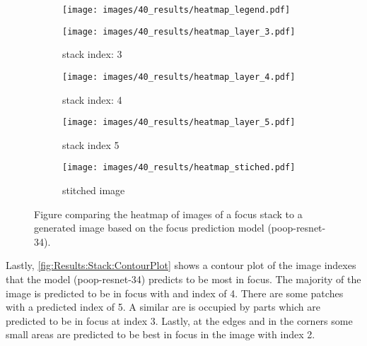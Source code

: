 \begin{figure}
    \centering
    \begin{subfigure}[b]{0.75\textwidth}
        \centering
        \texttt{[image: images/40\_results/heatmap\_legend.pdf]}
    \end{subfigure}
    \begin{subfigure}[b]{0.45\textwidth}
        \centering
        \texttt{[image: images/40\_results/heatmap\_layer\_3.pdf]}
        \caption{stack index: 3}
        \label{fig:Results:Stack:HeatMap:Stack3}
        \vspace{1em}
    \end{subfigure}%
    \begin{subfigure}[b]{0.45\textwidth}
        \centering
        \texttt{[image: images/40\_results/heatmap\_layer\_4.pdf]}
        \caption{stack index: 4}
        \label{fig:Results:Stack:HeatMap:Stack4}
        \vspace{1em}
    \end{subfigure}
    \par
    \begin{subfigure}[b]{0.45\textwidth}
        \centering
        \texttt{[image: images/40\_results/heatmap\_layer\_5.pdf]}
        \caption{stack index 5}
        \label{fig:Results:Stack:HeatMap:Stack5}
    \end{subfigure}%
    \begin{subfigure}[b]{0.45\textwidth}
        \centering
        \texttt{[image: images/40\_results/heatmap\_stiched.pdf]}
        \caption{stitched image}
        \label{fig:Results:Stack:HeatMap:Stiched}
    \end{subfigure}
    \caption{Figure comparing the heatmap of images of a focus stack to a generated image based on the focus prediction model (\acs{poop}-\acs{resnet}-34).}
    \label{fig:Results:Stack:HeatMap}
\end{figure}

Lastly, \autoref{fig:Results:Stack:ContourPlot} shows a contour plot of the image indexes that the model (\acs{poop}-\acs{resnet}-34) predicts to be most in focus. The majority of the image is predicted to be in focus with and index of 4. There are some patches with a predicted index of 5. A similar are is occupied by parts which are predicted to be in focus at index 3. Lastly, at the edges and in the corners some small areas are predicted to be best in focus in the image with index 2. 

